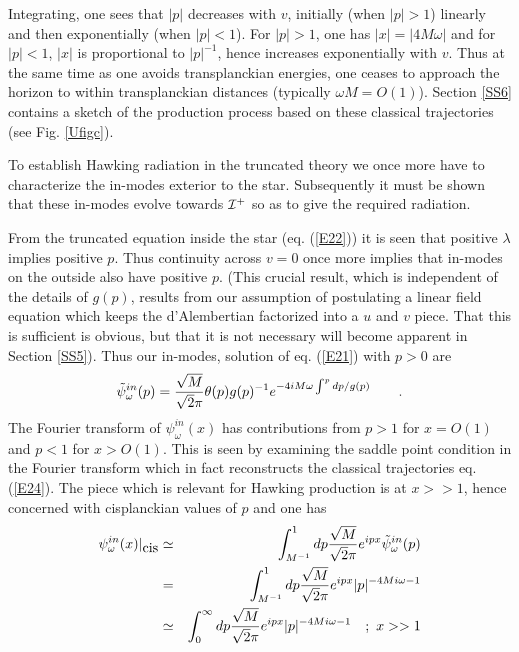 \documentclass[12pt]{article}
\begin{document}
\noindent Integrating, one sees that $\vert p \vert$ decreases with $v$, initially
(when $\vert p\vert >1$) linearly and then exponentially 
(when $ \vert p \vert <1$). For
$ \vert p \vert  >1$, one has $ \vert x \vert  = \vert 4 M \omega \vert$ and for 
$\vert p \vert <
1$, $\vert x \vert $ is proportional to $\vert p \vert^{-1}$, hence increases
exponentially with $v$. Thus at the same time as one avoids transplanckian
energies, one ceases to approach the horizon to within transplanckian distances
(typically $\omega M = O(1)$).
Section \ref{SS6} contains a sketch of the production process based on these
classical trajectories (see Fig. \ref{Ufigc}).

To establish Hawking radiation in the truncated theory we once more have to
characterize the in-modes exterior to the star. Subsequently it must be shown
that these in-modes evolve towards ${\cal I }^+$ so as to give the required
radiation.
\par From the truncated equation inside the star (eq. (\ref{E22})) it is seen
that  positive $\lambda$ 
implies positive $p$. Thus continuity across $v=0$
once more implies
that in-modes on the outside also have positive $p$. (This crucial
result, which is independent of the details of $g(p)$, results from our
assumption of postulating a linear field equation which keeps the
d'Alembertian factorized into a $u$ and $v$ piece. That this is sufficient is
obvious, but that it is not necessary will become apparent in Section
\ref{SS5}). Thus our in-modes, solution of  eq. (\ref{E21}) with $p>0$ are
\begin{equation}
\tilde \psi ^{in}_\omega (p) ={ \sqrt{M} \over \sqrt{2} \pi}\theta(p) g(p)^{-1}
e^{-4 i M \omega \int^p dp / g(p)}\qquad .
\label{E25}
\end{equation}
The Fourier transform of  $\psi ^{in}_\omega (x)$ has contributions from
$p >1$ for $x = O(1)$ and $p<1$ for $x>O(1)$. This is seen by
examining the saddle point condition in the Fourier transform which in fact
reconstructs the classical trajectories  eq. (\ref{E24}). The piece which is
relevant for Hawking production is at $x>>1$, hence concerned with cisplanckian
values of $p$ and  one has 
\begin{eqnarray}
\psi ^{in}_\omega (x)\vert_{\mbox{\rm cis}}
&\simeq& \int^{1}_{M^{-1}} dp { \sqrt{M} \over \sqrt{2} \pi}e^{ipx}
\tilde
\psi ^{in}_\omega (p)\nonumber\\ 
&=& \int_{M^{-1}}^1 dp { \sqrt{M} \over \sqrt{2}
\pi}e^{ipx} \vert p \vert ^{-4 M i \omega -1} \nonumber\\ 
&\simeq& \int^{\infty}_0 dp { \sqrt{M} \over \sqrt{2}
\pi}e^{ipx} \vert p \vert ^{-4 M i \omega -1} \quad ; \ x>>1 \label{E26}
\end{eqnarray}
\end{document}
